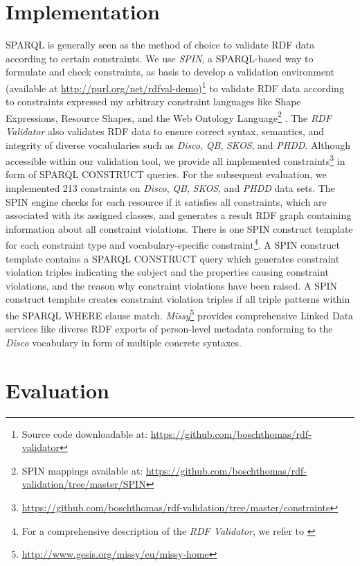 \documentclass{llncs}
\begin{document}
{{\section{Implementation}
\label{implementation}

SPARQL is generally seen as the method of choice to validate RDF data according to certain constraints.
We use \emph{SPIN}, 
a SPARQL-based way to formulate and check constraints, as basis to develop a
validation environment (available at \url{http://purl.org/net/rdfval-demo})\footnote{Source code downloadable at: \url{https://github.com/boschthomas/rdf-validator}} to validate RDF data according to constraints expressed my arbitrary constraint languages like Shape Expressions,
Resource Shapes, and the Web Ontology Language\footnote{SPIN mappings available at: \url{https://github.com/boschthomas/rdf-validation/tree/master/SPIN}} \cite{BoschEckert2014-2}.
The \emph{RDF Validator} also validates RDF data to ensure correct syntax, semantics, and integrity of diverse vocabularies such as \emph{Disco}, \emph{QB}, \emph{SKOS}, and \emph{PHDD}.
Although accessible within our validation tool, we provide all implemented constraints\footnote{\url{https://github.com/boschthomas/rdf-validation/tree/master/constraints}} in form of SPARQL CONSTRUCT queries.
For the subsequent evaluation, we implemented 213 constraints on \emph{Disco}, \emph{QB}, \emph{SKOS}, and \emph{PHDD} data sets.
The SPIN engine checks for each resource if it satisfies all constraints, which are associated with its assigned classes, and generates a result RDF graph containing information about all constraint violations.
There is one SPIN construct template for each constraint type and vocabulary-specific constraint\footnote{For a comprehensive description of the \emph{RDF Validator}, we refer to \cite{BoschEckert2014-2}}.
A SPIN construct template contains a SPARQL CONSTRUCT query which generates constraint violation triples indicating the subject and the properties causing constraint violations, and the reason why constraint violations have been raised.
A SPIN construct template creates constraint violation triples if all triple patterns within the SPARQL WHERE clause match.
\emph{Missy}\footnote{\url{http://www.gesis.org/missy/eu/missy-home}} provides comprehensive Linked Data services like diverse RDF exports of person-level metadata conforming to the \emph{Disco} vocabulary in form of multiple concrete syntaxes. 

\section{Evaluation}
\label{evaluation}

}}
\end{document}
